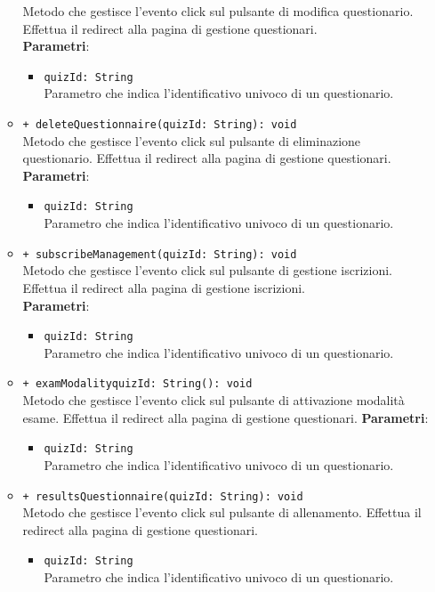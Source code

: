 \begin{itemize}
\begin{itemize}
		Metodo che gestisce l'evento click sul pulsante di modifica questionario. Effettua il redirect alla pagina di gestione questionari.\\
		\textbf{Parametri}:
		\begin{itemize}
			\item \texttt{quizId: String}\\ 
			Parametro che indica l'identificativo univoco di un questionario.
		\end{itemize}
		\item \texttt{+ deleteQuestionnaire(quizId: String): void} \\
		Metodo che gestisce l'evento click sul pulsante di eliminazione questionario. Effettua il redirect alla pagina di gestione questionari.\\
		\textbf{Parametri}:  
		\begin{itemize}
			\item \texttt{quizId: String}\\
			Parametro che indica l'identificativo univoco di un questionario.
		\end{itemize}
		
		\item \texttt{+ subscribeManagement(quizId: String): void} \\
		Metodo che gestisce l'evento click sul pulsante di gestione iscrizioni. Effettua il redirect alla pagina di gestione iscrizioni.\\
		\textbf{Parametri}:
		\begin{itemize}
			\item \texttt{quizId: String}\\
			Parametro che indica l'identificativo univoco di un questionario.
		\end{itemize}
		
		\item \texttt{+ examModalityquizId: String(): void} \\
		Metodo che gestisce l'evento click sul pulsante di attivazione modalità esame. Effettua il redirect alla pagina di gestione questionari.
		\textbf{Parametri}:
		\begin{itemize}
			\item \texttt{quizId: String}\\ 
			Parametro che indica l'identificativo univoco di un questionario.
		\end{itemize}
		\item \texttt{+ resultsQuestionnaire(quizId: String): void} \\
		Metodo che gestisce l'evento click sul pulsante di allenamento. Effettua il redirect alla pagina di gestione questionari.
		\begin{itemize}
			\item \texttt{quizId: String}\\
			Parametro che indica l'identificativo univoco di un questionario.
		\end{itemize}   
	\end{itemize}
\end{itemize}